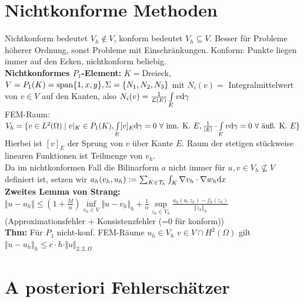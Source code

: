 \documentclass[12pt]{scrartcl}
\begin{document}
	\section{Nichtkonforme Methoden}
	
	Nichtkonform bedeutet $V_h\not\in V$, konform bedeutet $V_h\subseteq V$.
	Besser für Probleme höherer Ordnung, sonst Probleme mit Einschränkungen.
	Konform: Punkte liegen immer auf den Ecken, nichtkonform beliebig.\\
	\textbf{Nichtkonformes $P_1$-Element:} $K=$Dreieck, $V=P_1(K)=\operatorname{span}\lbrace 1,x,y\rbrace,\Sigma=\lbrace N_1,N_2,N_3\rbrace$ mit $N_i(v)=$ Integralmittelwert von $v\in V$ auf den Kanten, also $N_i(v)=\frac{1}{\mathcal{L}(E)}\int\limits_E v\mathrm{d}\gamma$\\
	FEM-Raum: $V_h=\lbrace v\in L^2(\Omega)\mid	v|_K\in P_1(K),\int\limits_E [v]_E\mathrm{d}\gamma=0~\forall	\text{ inn. K. $E$},	\frac{1}{|E|}\cdot\int\limits_E v\mathrm{d}\gamma=0~\forall\text{ äuß. K. }E\rbrace$\\
	Hierbei ist $[v]_E$ der Sprung von $v$ über Kante $E$. Raum der stetigen stückweise linearen Funktionen ist Teilmenge von $v_h$.\\
	Da im nichtkonformen Fall die Bilinarform $a$ nicht immer für $u,v\in V_h\not\subseteq V$ definiert ist, setzen wir $a_h(v_h,u_h):=\sum_{K\in\mathcal{T}_h}\int_K \nabla v_h\cdot\nabla w_h\mathrm{d} x$\\
	\textbf{Zweites Lemma von Strang:} $\Vert u-u_h\Vert\leq(1+\frac{M}{\alpha})\inf\limits_{v_h\in V}\Vert u-v_h\Vert_h+\frac{1}{\alpha}\sup\limits_{z_h\in V_h}\frac{a_h(u,z_h)-f_h(z_h)}{\Vert z_h\Vert_h}$ (Approximationsfehler + Konsistenzfehler (=0 für konform))\\
	\textbf{Thm:} Für $P_1$ nicht-konf. FEM-Räume $u_h\in V_h$ $v\in V\cap H^2(\Omega)$ gilt $\Vert u-u_h\Vert_h\leq c\cdot h\cdot\Vert u\Vert_{2,2,\Omega}$
	
	\section{A posteriori Fehlerschätzer}
	
\end{document}

